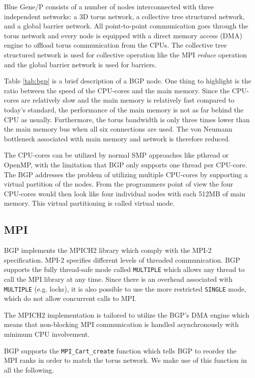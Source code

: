 \documentclass[preprint,3p,times,twocolumn]{elsarticle}
\begin{document}
Blue Gene/P consists of a number of nodes interconnected with three independent networks: a 3D torus network, a collective tree structured network, and a global barrier network. All point-to-point communication goes through the torus network and every node is equipped with a direct memory access (DMA) engine to offload torus communication from the CPUs. The collective tree structured network is used for collective operation like the MPI \emph{reduce} operation and the global barrier network is used for barriers.

Table \ref{tab:bgp} is a brief description of a BGP node. One thing to highlight is the ratio between the speed of the CPU-cores and the main memory. 
Since the CPU-cores are relatively slow and the main memory is relatively fast compared to today's standard, the performance of the main memory is not as far behind the CPU as usually. Furthermore, the torus bandwidth is only three times lower than the main memory bus when all six connections are used. The von Neumann bottleneck\cite{Backus78} associated with main memory and network is therefore reduced.

The CPU-cores can be utilized by normal SMP approaches like pthread or OpenMP, with the limitation that BGP only supports one thread per CPU-core. The BGP addresses the problem of utilizing multiple CPU-cores by supporting a virtual partition of the nodes. From the programmers point of view the four CPU-cores would then look like four individual nodes with each 512MB of main memory. This virtual partitioning is called virtual mode.

\subsection{MPI}
BGP implements the MPICH2 library which comply with the MPI-2 specification\cite{mpi2}. MPI-2 specifies different levels of threaded communication. BGP supports the fully thread-safe mode called \texttt{MULTIPLE} which allows any thread to call the MPI library at any time. Since there is an overhead associated with \texttt{MULTIPLE} (e.g. locks), it is also possible to use the more restricted \texttt{SINGLE} mode, which do not allow concurrent calls to MPI.

The MPICH2 implementation is tailored to utilize the BGP's DMA engine which means that non-block\-ing MPI communication is handled asynchronously with minimum CPU involvement.

BGP supports the \texttt{MPI\_Cart\_create} function which tells BGP to reorder the MPI ranks in order to match the torus network. We make use of this function in all the following.
\end{document}
